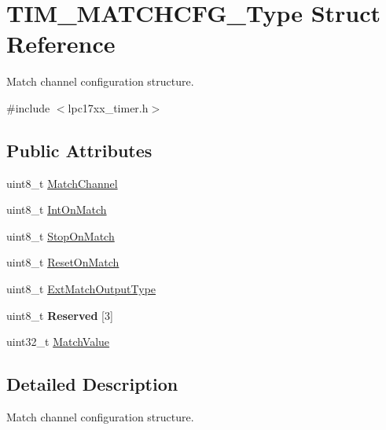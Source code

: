 \hypertarget{struct_t_i_m___m_a_t_c_h_c_f_g___type}{\section{\-T\-I\-M\-\_\-\-M\-A\-T\-C\-H\-C\-F\-G\-\_\-\-Type \-Struct \-Reference}
\label{struct_t_i_m___m_a_t_c_h_c_f_g___type}
}


\-Match channel configuration structure.  




{\ttfamily \#include $<$lpc17xx\-\_\-timer.\-h$>$}

\subsection*{\-Public \-Attributes}
\begin{DoxyCompactItemize}
\item 
uint8\-\_\-t \hyperlink{struct_t_i_m___m_a_t_c_h_c_f_g___type_a3d7414f4ad112270c774d2ec42c97f04}{\-Match\-Channel}
\item 
uint8\-\_\-t \hyperlink{struct_t_i_m___m_a_t_c_h_c_f_g___type_ab07a725d2072b5b92632939e23b190f9}{\-Int\-On\-Match}
\item 
uint8\-\_\-t \hyperlink{struct_t_i_m___m_a_t_c_h_c_f_g___type_a158b1f6cd2fca23885fab8f6be25ae83}{\-Stop\-On\-Match}
\item 
uint8\-\_\-t \hyperlink{struct_t_i_m___m_a_t_c_h_c_f_g___type_a2cc6f3d39fcdf6e8d206a644fdb725b0}{\-Reset\-On\-Match}
\item 
uint8\-\_\-t \hyperlink{struct_t_i_m___m_a_t_c_h_c_f_g___type_a24884008a29410f4a5e6bd761ce21458}{\-Ext\-Match\-Output\-Type}
\item 
\hypertarget{struct_t_i_m___m_a_t_c_h_c_f_g___type_a7b2f9317981a0656b5120b84a3a1d2d8}{uint8\-\_\-t {\bfseries \-Reserved} \mbox{[}3\mbox{]}}\label{struct_t_i_m___m_a_t_c_h_c_f_g___type_a7b2f9317981a0656b5120b84a3a1d2d8}

\item 
uint32\-\_\-t \hyperlink{struct_t_i_m___m_a_t_c_h_c_f_g___type_a354006a387d617c7cbde6e210cc54e48}{\-Match\-Value}
\end{DoxyCompactItemize}


\subsection{\-Detailed \-Description}
\-Match channel configuration structure. 

